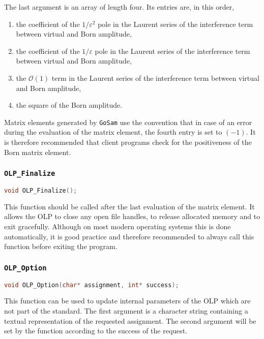 \documentclass[11pt,a4paper]{refrep}
\newcommand{\golemversion}{{1{.}0}}
\newcommand{\golemv}[1][\golemversion]{{\tt GoSam}\xspace}
\begin{document}
The last argument is an array of length four. Its entries are, in this order,
\begin{enumerate}
\item the coefficient of the $1/\varepsilon^2$ pole in the Laurent series
   of the interference term between virtual and Born amplitude,
\item the coefficient of the $1/\varepsilon$ pole in the Laurent series
   of the interference term between virtual and Born amplitude,
\item the $\mathcal{O}(1)$ term in the Laurent series
   of the interference term between virtual and Born amplitude,
\item the square of the Born amplitude.
\end{enumerate}

Matrix elements generated by \golemv{} use the convention that in case
of an error during the evaluation of the matrix element, the fourth
entry is set to $(-1)$. It is therefore recommended that client programs
check for the positiveness of the Born matrix element.

\subsubsection{\texttt{OLP\_Finalize}}
\begin{lstlisting}[language=C]
void OLP_Finalize();
\end{lstlisting}

This function should be called after the last evaluation of the matrix
element. It allows the OLP to close any open file handles, to release
allocated memory and to exit gracefully.
Although on most modern operating systems this is done automatically,
it is good practice and therefore recommended to always call this function
before exiting the program.

\subsubsection{\texttt{OLP\_Option}}
\begin{lstlisting}[language=C]
void OLP_Option(char* assignment, int* success);
\end{lstlisting}

This function can be used to update internal parameters of the OLP which
are not part of the standard. The first argument is a character string
containing a textual representation of the requested assignment. The
second argument will be set by the function according to the success
of the request.
\end{document}

